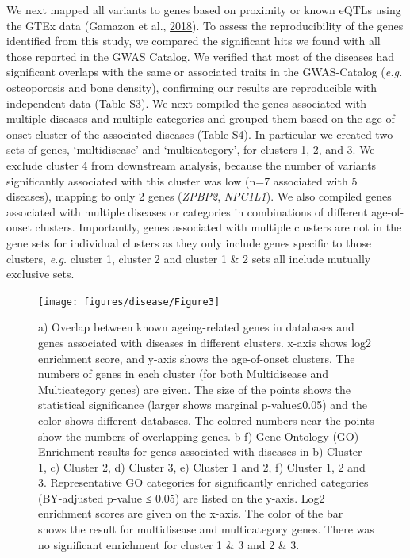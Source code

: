 \documentclass[12pt,twoside]{unicam}
\begin{document}
We next mapped all variants to genes based on proximity or known eQTLs using the GTEx data (Gamazon et al., \protect\hyperlink{ref-Gamazon2018}{2018}). To assess the reproducibility of the genes identified from this study, we compared the significant hits we found with all those reported in the GWAS Catalog. We verified that most of the diseases had significant overlaps with the same or associated traits in the GWAS-Catalog (\emph{e.g.} osteoporosis and bone density), confirming our results are reproducible with independent data (Table S3). We next compiled the genes associated with multiple diseases and multiple categories and grouped them based on the age-of-onset cluster of the associated diseases (Table S4). In particular we created two sets of genes, `multidisease' and `multicategory', for clusters 1, 2, and 3. We exclude cluster 4 from downstream analysis, because the number of variants significantly associated with this cluster was low (n=7 associated with 5 diseases), mapping to only 2 genes (\emph{ZPBP2}, \emph{NPC1L1}). We also compiled genes associated with multiple diseases or categories in combinations of different age-of-onset clusters. Importantly, genes associated with multiple clusters are not in the gene sets for individual clusters as they only include genes specific to those clusters, \emph{e.g.} cluster 1, cluster 2 and cluster 1 \& 2 sets all include mutually exclusive sets.

\begin{figure}

{\centering \texttt{[image: figures/disease/Figure3]} 

}

\caption[Associations between genes associated with different age-of-onset clusters and ageing-related genes or gene ontology categories.]{a) Overlap between known ageing-related genes in databases and genes associated with diseases in different clusters. x-axis shows log2 enrichment score, and y-axis shows the age-of-onset clusters. The numbers of genes in each cluster (for both Multidisease and Multicategory genes) are given. The size of the points shows the statistical significance (larger shows marginal p-value≤0.05) and the color shows different databases. The colored numbers near the points show the numbers of overlapping genes. b-f) Gene Ontology (GO) Enrichment results for genes associated with diseases in b) Cluster 1, c) Cluster 2, d) Cluster 3, e) Cluster 1 and 2, f) Cluster 1, 2 and 3. Representative GO categories for significantly enriched categories (BY-adjusted p-value ≤ 0.05) are listed on the y-axis. Log2 enrichment scores are given on the x-axis. The color of the bar shows the result for multidisease and multicategory genes. There was no significant enrichment for cluster 1 \& 3 and 2 \& 3.}\label{fig:disFig3}
\end{figure}
\end{document}

